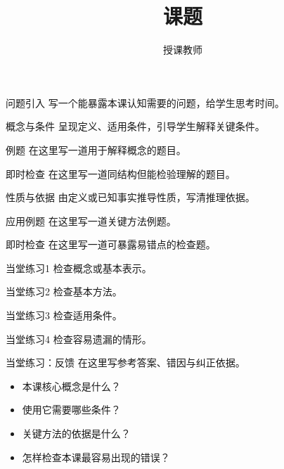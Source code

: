 \documentclass[aspectratio=169,10pt]{beamer}
\title{课题}\author{授课教师}\date{}
\begin{document}
\campusmaketitle
\begin{frame}[t]{问题引入}
  写一个能暴露本课认知需要的问题，给学生思考时间。
\end{frame}
\begin{frame}[t]{概念与条件}
  呈现定义、适用条件，引导学生解释关键条件。
\end{frame}
\begin{campuspractice}{例题}
  在这里写一道用于解释概念的题目。
\end{campuspractice}
\begin{campuspractice}{即时检查}
  在这里写一道同结构但能检验理解的题目。
\end{campuspractice}
\begin{frame}[t]{性质与依据}
  由定义或已知事实推导性质，写清推理依据。
\end{frame}
\begin{campuspractice}{应用例题}
  在这里写一道关键方法例题。
\end{campuspractice}
\begin{campuspractice}{即时检查}
  在这里写一道可暴露易错点的检查题。
\end{campuspractice}
\begin{campuspractice}{当堂练习1}
  检查概念或基本表示。
\end{campuspractice}
\begin{campuspractice}{当堂练习2}
  检查基本方法。
\end{campuspractice}
\begin{campuspractice}{当堂练习3}
  检查适用条件。
\end{campuspractice}
\begin{campuspractice}{当堂练习4}
  检查容易遗漏的情形。
\end{campuspractice}
\ifdefined\TeacherEdition
\begin{frame}[t]{当堂练习：反馈}
  在这里写参考答案、错因与纠正依据。
\end{frame}
\fi
\begin{campussummary}
\begin{itemize}
\item 本课核心概念是什么？
\item 使用它需要哪些条件？
\item 关键方法的依据是什么？
\item 怎样检查本课最容易出现的错误？
\end{itemize}
\end{campussummary}
\campusclosing[谢谢]
\end{document}
